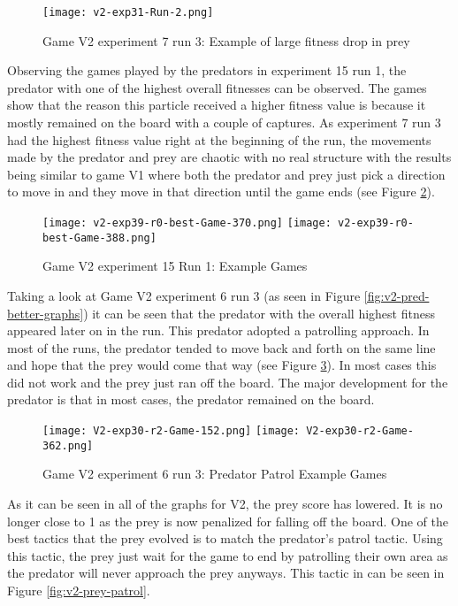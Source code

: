 \begin{figure}
  \centering
  \texttt{[image: v2-exp31-Run-2.png]}
  \caption{Game V2 experiment 7 run 3: Example of large fitness drop in prey}
  \label{fig:v2-prey-large-drop}
\end{figure}

Observing the games played by the predators in experiment 15 run 1, the predator with one of the highest overall fitnesses can be observed. The games show that the reason this particle received a higher fitness value is because it mostly remained on the board with a couple of captures. As experiment 7 run 3 had the highest fitness value right at the beginning of the run, the movements made by the predator and prey are chaotic with no real structure with the results being similar to game V1 where both the predator and prey just pick a direction to move in and they move in that direction until the game ends (see Figure \ref{fig:v2-exp39-best}). 

\begin{figure}
  \centering
  \texttt{[image: v2-exp39-r0-best-Game-370.png]}  \texttt{[image: v2-exp39-r0-best-Game-388.png]}
  \caption{Game V2 experiment 15 Run 1: Example Games}
  \label{fig:v2-exp39-best}
\end{figure}

Taking a look at Game V2 experiment 6 run 3 (as seen in Figure \ref{fig:v2-pred-better-graphs}) it can be seen that the predator with the overall highest fitness appeared later on in the run. This predator adopted a patrolling approach. In most of the runs, the predator tended to move back and forth on the same line and hope that the prey would come that way (see Figure \ref{fig:v2-pred-patrol}). In most cases this did not work and the prey just ran off the board. The major development for the predator is that in most cases, the predator remained on the board.

\begin{figure}
  \centering
  \texttt{[image: V2-exp30-r2-Game-152.png]}  \texttt{[image: V2-exp30-r2-Game-362.png]}
  \caption{Game V2 experiment 6 run 3: Predator Patrol Example Games}
  \label{fig:v2-pred-patrol}
\end{figure}

As it can be seen in all of the graphs for V2, the prey score has lowered. It is no longer close to 1 as the prey is now penalized for falling off the board. One of the best tactics that the prey evolved is to match the predator's patrol tactic. Using this tactic, the prey just wait for the game to end by patrolling their own area as the predator will never approach the prey anyways. This tactic in can be seen in Figure \ref{fig:v2-prey-patrol}.

